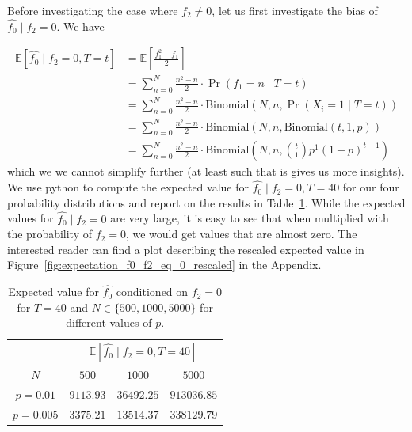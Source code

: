 \documentclass{article}
\begin{document}
Before investigating the case where $f_2\neq 0$, let us first investigate the bias of $\hat{f_0}\mid f_2 = 0$.
We have 
{
\allowdisplaybreaks
\begin{align*}
    \mathbb{E}\left[ \hat{f_0} \mid f_2 = 0, T=t \right] &= \mathbb{E}\left[ \frac{f_1^2 - f_1}{2} \right] \\ 
    &= \sum_{n=0}^N \frac{n^2 - n}{2} \cdot \Pr(f_1 = n \mid T=t) \\
    &= \sum_{n=0}^N \frac{n^2 - n}{2} \cdot \mathrm{Binomial}(N, n, \Pr(X_i = 1 \mid T=t)) \\
    &= \sum_{n=0}^N \frac{n^2 - n}{2} \cdot \mathrm{Binomial}(N, n, \mathrm{Binomial}(t, 1, p)) \\
    &= \sum_{n=0}^N \frac{n^2 - n}{2} \cdot \mathrm{Binomial}(N, n, \binom{t}{1} p^1 {(1-p)}^{t-1})
\end{align*}
which we we cannot simplify further (at least such that is gives us more insights). We use python to compute the expected value for $\hat{f_0} \mid f_2 = 0, T=40$ for our four probability distributions and report on the results in Table~\ref{tab:expected_value_f0_f2_eq_0}. While the expected values for $\hat{f_0}\mid f_2 = 0$ are very large, it is easy to see that when multiplied with the probability of $f_2 = 0$, we would get values that are almost zero. The interested reader can find a plot describing the rescaled expected value in Figure~\ref{fig:expectation_f0_f2_eq_0_rescaled} in the Appendix.


\begin{table}[t]
    \centering
    \begin{tabular}{c|c c c}
        \toprule
         & \multicolumn{3}{c}{$\mathbb{E}[\hat{f_0} \mid f_2 = 0, T=40]$} \\
        \midrule
        $N$ & $500$ & $1000$ & $5000$ \\
        \midrule
        $p=0.01$  & $9113.93$   & $36492.25$  & $913036.85$ \\
        $p=0.005$ & $3375.21$   & $13514.37$  & $338129.79$ \\
    \end{tabular}
    \caption{Expected value for $\hat{f_0}$ conditioned on $f_2 = 0$ for $T=40$ and $N \in \{500, 1000, 5000\}$ for different values of $p$.}
    \label{tab:expected_value_f0_f2_eq_0}
\end{table}
}
\end{document}
